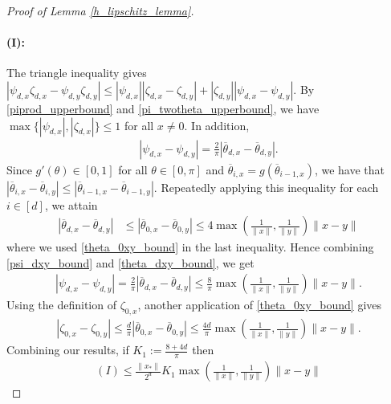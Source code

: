 \documentclass[11pt]{article}
\theoremstyle{remark}
\begin{document}
\begin{proof}[Proof of Lemma \ref{h_lipschitz_lemma}]
\paragraph{(I):} The triangle inequality gives $
|\psi_{d,x}\zeta_{d,x} - \psi_{d,y}\zeta_{d,y}| \leqslant |\psi_{d,x}||\zeta_{d,x} - \zeta_{d,y}| + |\zeta_{d,y}||\psi_{d,x} - \psi_{d,y}|.$ By \eqref{piprod_upperbound} and \eqref{pi_twotheta_upperbound}, we have $\max\{|\psi_{d,x}|,|\zeta_{d,x}|\} \leqslant 1$ for all $x \neq 0$. In addition, \begin{align}
|\psi_{d,x} - \psi_{d,y}| = \frac{2}{\pi}|\overline{\theta}_{d,x} - \overline{\theta}_{d,y}|. \label{psi_dxy_bound}
\end{align} Since $g'(\theta) \in [0,1]$ for all $\theta \in [0,\pi]$ and $\overline{\theta}_{i,x} = g(\overline{\theta}_{i-1,x})$, we have that 
$|\overline{\theta}_{i,x} - \overline{\theta}_{i,y}|  \leqslant |\overline{\theta}_{i-1,x} - \overline{\theta}_{i-1,y}|.$
Repeatedly applying this inequality for each $i \in [d]$, we attain
\begin{align}
|\overline{\theta}_{d,x} - \overline{\theta}_{d,y}| & \leqslant |\overline{\theta}_{0,x} - \overline{\theta}_{0,y}| \leqslant 4 \max\left(\frac{1}{\|x\|},\frac{1}{\|y\|}\right)\|x - y \| \label{theta_dxy_bound}
\end{align} where we used \eqref{theta_0xy_bound} in the last inequality. Hence combining \eqref{psi_dxy_bound} and \eqref{theta_dxy_bound}, we get \begin{align*}
|\psi_{d,x} - \psi_{d,y}| = \frac{2}{\pi}|\overline{\theta}_{d,x} - \overline{\theta}_{d,y}| \leqslant \frac{8}{\pi} \max\left(\frac{1}{\|x\|},\frac{1}{\|y\|}\right)\|x - y \|.
\end{align*} Using the definition of $\zeta_{0,x}$, another application of \eqref{theta_0xy_bound} gives \begin{align*}
|\zeta_{0,x} - \zeta_{0,y}| \leqslant \frac{d}{\pi}|\overline{\theta}_{0,x} - \overline{\theta}_{0,y}| \leqslant \frac{4d}{\pi} \max\left(\frac{1}{\|x\|},\frac{1}{\|y\|}\right)\|x - y \|. 
\end{align*} Combining our results, if $K_1 := \frac{8 + 4d}{\pi}$ then
\begin{align}
(I) \leqslant \frac{\|x_*\|}{2^d}K_1\max\left(\frac{1}{\|x\|},\frac{1}{\|y\|}\right)\|x - y\| \label{I_bound}
\end{align} 


\end{proof}
\end{document}
